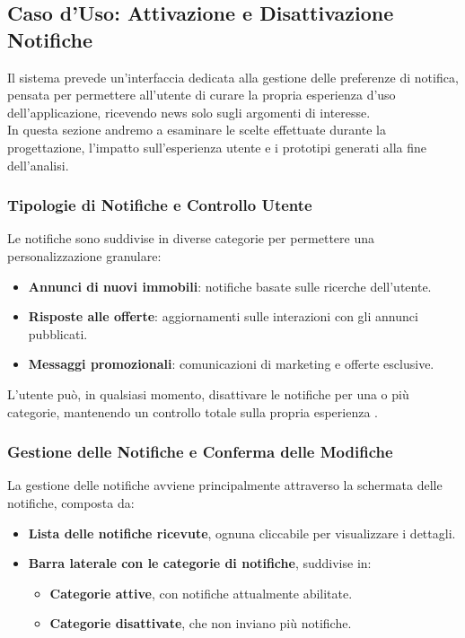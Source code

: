 \subsection{Caso d'Uso: Attivazione e Disattivazione Notifiche}

Il sistema prevede un'interfaccia dedicata alla gestione delle preferenze di notifica, pensata per permettere all'utente di curare la propria esperienza d'uso dell'applicazione, ricevendo news solo sugli argomenti di interesse.\\
In questa sezione andremo a esaminare le scelte effettuate durante la progettazione, l'impatto sull'esperienza utente e i prototipi generati alla fine dell'analisi. 

\vspace{0.5cm}
\subsubsection{Tipologie di Notifiche e Controllo Utente}
Le notifiche sono suddivise in diverse categorie per permettere una personalizzazione granulare:
\begin{itemize}
    \item \textbf{Annunci di nuovi immobili}: notifiche basate sulle ricerche dell’utente.
    \item \textbf{Risposte alle offerte}: aggiornamenti sulle interazioni con gli annunci pubblicati.
    \item \textbf{Messaggi promozionali}: comunicazioni di marketing e offerte esclusive.
\end{itemize}
L’utente può, in qualsiasi momento, disattivare le notifiche per una o più categorie, mantenendo un controllo totale sulla propria esperienza \cite{shneiderman2004}.

\vspace{0.5cm}
\subsubsection{Gestione delle Notifiche e Conferma delle Modifiche}
La gestione delle notifiche avviene principalmente attraverso la schermata delle notifiche, composta da:
\begin{itemize}
    \item \textbf{Lista delle notifiche ricevute}, ognuna cliccabile per visualizzare i dettagli.
    \item \textbf{Barra laterale con le categorie di notifiche}, suddivise in:
    \begin{itemize}
        \item \textbf{Categorie attive}, con notifiche attualmente abilitate.
        \item \textbf{Categorie disattivate}, che non inviano più notifiche.
    \end{itemize}
\end{itemize}

